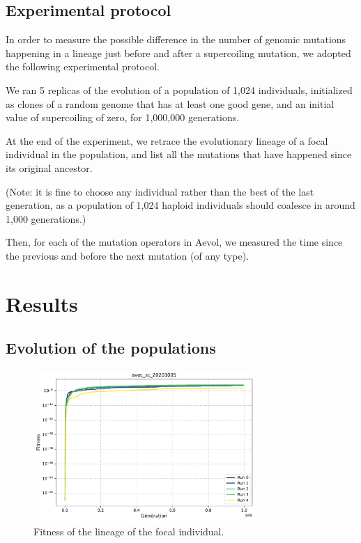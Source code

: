 \subsection{Experimental protocol}

In order to measure the possible difference in the number of genomic mutations happening in a lineage just before and after a supercoiling mutation, we adopted the following experimental protocol.

We ran 5 replicas of the evolution of a population of 1,024 individuals, initialized as clones of a random genome that has at least one good gene, and an initial value of supercoiling of zero, for 1,000,000 generations.

At the end of the experiment, we retrace the evolutionary lineage of a focal individual in the population, and list all the mutations that have happened since its original ancestor.

(Note: it is fine to choose any individual rather than the best of the last generation, as a population of 1,024 haploid individuals should coalesce in around 1,000 generations.)

Then, for each of the mutation operators in Aevol, we measured the time since the previous and before the next mutation (of any type).

\pagebreak

\section{Results}

\subsection{Evolution of the populations}

\begin{figure}[h!]
  \centering
  \includegraphics[width=0.75\textwidth]{aevol/images/fitness_agrege.pdf}
  \caption{Fitness of the lineage of the focal individual.}
  \label{fig:fitness}
\end{figure}


